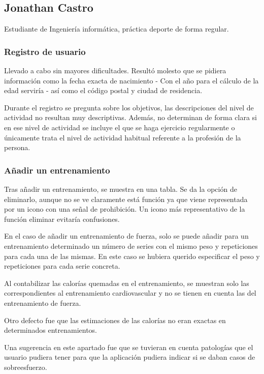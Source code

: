 \documentclass[a4paper]{article}
\begin{document}
	\subsection{Jonathan Castro}
	
	Estudiante de Ingeniería informática, práctica deporte de forma regular.
	
		\subsubsection*{Registro de usuario}
		
		Llevado a cabo sin mayores dificultades. Resultó molesto que se pidiera información como la fecha exacta de nacimiento - Con el año para el cálculo de la edad serviría - así como el código postal y ciudad de residencia.
		
		Durante el registro se pregunta sobre los objetivos, las descripciones del nivel de actividad no resultan muy descriptivas. Además, no determinan de forma clara si en ese nivel de actividad se incluye el que se haga ejercicio regularmente o únicamente trata el nivel de actividad habitual referente a la profesión de la persona.
		
		\subsubsection*{Añadir un entrenamiento}
		
		Tras añadir un entrenamiento, se muestra en una tabla. Se da la opción de eliminarlo, aunque no se ve claramente está función ya que viene representada por un icono con una señal de prohibición. Un icono más representativo de la función eliminar evitaría confusiones.
		
		En el caso de añadir un entrenamiento de fuerza, solo se puede añadir para un entrenamiento determinado un número de series con el mismo peso y repeticiones para cada una de las mismas. En este caso se hubiera querido especificar el peso y repeticiones para cada serie concreta.
		
		Al contabilizar las calorías quemadas en el entrenamiento, se muestran solo las correspondientes al entrenamiento cardiovascular y no se tienen en cuenta las del entrenamiento de fuerza.
		
		Otro defecto fue que las estimaciones de las calorías no eran exactas en determinados entrenamientos.
		
		Una sugerencia en este apartado fue que se tuvieran en cuenta patologías que el usuario pudiera tener para que la aplicación pudiera indicar si se daban casos de sobreesfuerzo.
		
\end{document}
